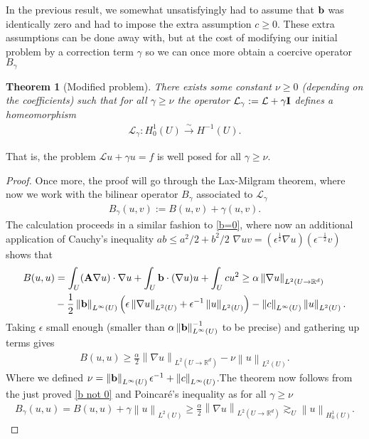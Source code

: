 \documentclass[
    a4paper,
    DIV=14,
    abstract=true,
    numbers=noenddot
]
{scrartcl}
\newtheorem{theorem}{Theorem}[section]
\theoremstyle{definition}
\newcommand{\qt}[1]{\left(#1\right)}
\renewcommand{\norm}[1]{\left\lVert #1 \right\rVert}\renewcommand{\abs}[1]{\left| #1 \right|}
\newcommand{\iso}{\xrightarrow{\sim}}
\newcommand{\R}{\mathbb{R}}
\newcommand{\Ll}{\mathcal{L}}
\begin{document}
In the previous result, we somewhat unsatisfyingly had to assume that $ \vb{b}$ was identically zero and had to impose the extra assumption  $c \geq 0$. These extra assumptions can be done away with, but at the cost of modifying our initial problem by a correction term $\gamma $ so we can once more obtain a coercive operator $B_\gamma $
\begin{theorem}[Modified problem]\label{mod}
    There exists some constant $\nu \geq 0$ (depending on the coefficients) such that for all $\gamma \geq \nu$  the operator $\Ll_\gamma := \Ll + \gamma \vb{I}$ defines a homeomorphism
    \begin{align*}
        \Ll_\gamma : H_0^1(U) \iso  H^{-1}(U).
    \end{align*}
\end{theorem}
That is, the problem $\Ll u +\gamma u =f$ is well posed for all $\gamma \geq \nu$.
\begin{proof}
    Once more, the proof will go through the Lax-Milgram theorem, where now we work with the bilinear operator $B_\gamma  $ associated to $\Ll_\gamma  $
    \begin{align*}
        B_\gamma  (u,v):= B(u,v) + \gamma  (u,v).
    \end{align*}
    The calculation proceeds in a similar fashion to  \eqref{b=0}, where now an additional application of Cauchy's inequality $ab\leq a^2/2+b^2/2$ $\nabla u v = (\epsilon^{\frac{1}{2}} \nabla u)(\epsilon^{-\frac{1}{2}}v)$  shows that
    \begin{align*}
        B(u,u) & = \int_{U}(\vb{A} \nabla u) \cdot \nabla u + \int_{U} \vb{b}\cdot  (\nabla u) u +  \int_{U} cu^2 \geq \alpha \norm{\nabla u}_{L^2(U \to \R^d)}              \\
               & - \frac{1}{2}\norm{\vb{b}}_{L^\infty(U)} \qt{\epsilon \norm{\nabla u}_{L^2(U)}+ \epsilon ^{-1}\norm{u}_{L^2(U)}}- \norm{c}_{L^\infty(U)}\norm{u}_{L^2(U)} .
    \end{align*}
    Taking $\epsilon $ small enough (smaller than $ \alpha \norm{\vb{b}}_{L^\infty(U)}^{-1}$ to be precise) and gathering up terms gives
    \begin{align}\label{b not 0}
        B(u,u) \geq \frac{\alpha}{2} \norm{\nabla u}_{L^2(U \to \R^d)} -\nu \norm{u}_{L^2(U)}.
    \end{align}
    Where we defined $\nu = \norm{\vb{b}}_{L^\infty(U)} \epsilon ^{-1}+\norm{c}_{L^\infty(U)}$.The theorem now follows from the just proved \eqref{b not 0} and Poincaré's inequality as for all $\gamma \geq \nu$
    \begin{align*}
        B_\gamma (u,u)=B(u,u)+ \gamma \norm{u}_{L^2(U)} \geq\frac{\alpha}{2} \norm{\nabla u}_{L^2(U \to \R^d)}\gtrsim _U \norm{u}_{H_0^1(U)} .
    \end{align*}
\end{proof}
\end{document}
